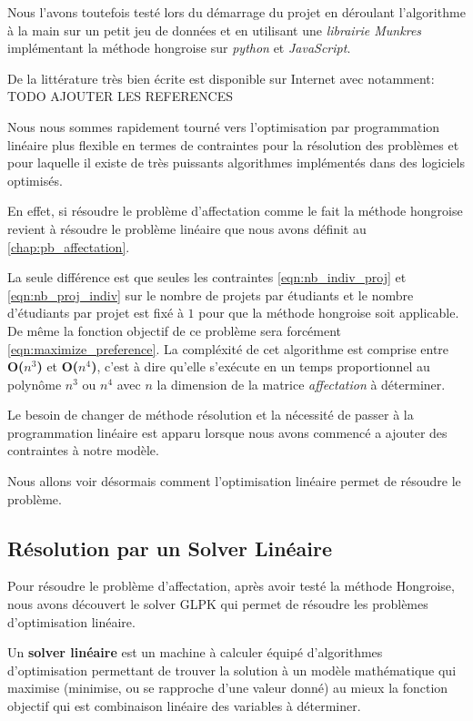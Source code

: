 \documentclass{polytech/polytech}
\begin{document}
Nous l'avons toutefois testé lors du démarrage du projet en déroulant l'algorithme à la main sur un petit jeu de données et en utilisant une \textit{librairie Munkres} implémentant la méthode hongroise sur \textit{python} et \textit{JavaScript}.

De la littérature très bien écrite est disponible sur Internet avec notamment: TODO AJOUTER LES REFERENCES

Nous nous sommes rapidement tourné vers l'optimisation par programmation linéaire plus flexible en termes de contraintes pour la résolution des problèmes et pour laquelle il existe de très puissants algorithmes implémentés dans des logiciels optimisés.

En effet, si résoudre le problème d'affectation comme le fait la méthode hongroise revient à résoudre le problème linéaire que nous avons définit au \autoref{chap:pb_affectation}.

La seule différence est que seules les contraintes \autoref{eqn:nb_indiv_proj} et \autoref{eqn:nb_proj_indiv} sur le nombre de projets par étudiants et le nombre d'étudiants par projet est fixé à $1$ pour que la méthode hongroise soit applicable.
De même la fonction objectif de ce problème sera forcément \autoref{eqn:maximize_preference}. La compléxité de cet algorithme est comprise entre \textbf{O($n^3$)} et  \textbf{O($n^4$)}, c'est à dire qu'elle s'exécute en un temps proportionnel au polynôme $n^3$ ou $n^4$ avec $n$ la dimension de la matrice \textit{affectation} à déterminer.

Le besoin de changer de méthode résolution et la nécessité de passer à la programmation linéaire est apparu lorsque nous avons commencé a ajouter des contraintes à notre modèle.

Nous allons voir désormais comment l'optimisation linéaire permet de résoudre le problème.

\subsection{Résolution par un Solver Linéaire}

Pour résoudre le problème d'affectation, après avoir testé la méthode Hongroise, nous avons découvert le solver GLPK qui permet de résoudre les problèmes d'optimisation linéaire.

Un \textbf{solver linéaire}  est un machine à calculer équipé d'algorithmes d'optimisation permettant de trouver la solution à un modèle mathématique qui maximise (minimise, ou se rapproche d'une valeur donné) au mieux la fonction objectif qui est combinaison linéaire des variables à déterminer.
\end{document}
